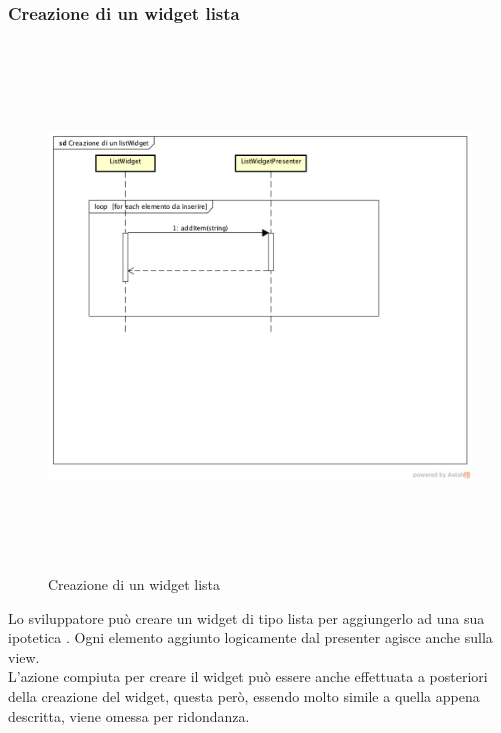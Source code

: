 \newpage

\subsubsection{Creazione di un widget lista}

\label{Creazione di un widget lista}
\begin{figure}[H]
	\centering
	\includegraphics[width=16cm, height=14cm]{Sezioni/Diagrammi/SDK/Creazione di un listWidget.png}
	\caption{Creazione di un widget lista}
\end{figure}

Lo sviluppatore può creare un widget di tipo lista per aggiungerlo ad una sua ipotetica . Ogni elemento aggiunto logicamente dal presenter agisce anche sulla view. \\
L'azione compiuta per creare il widget può essere anche effettuata a posteriori della creazione del widget, questa però, essendo molto simile a quella appena descritta, viene omessa per ridondanza.

\newpage


